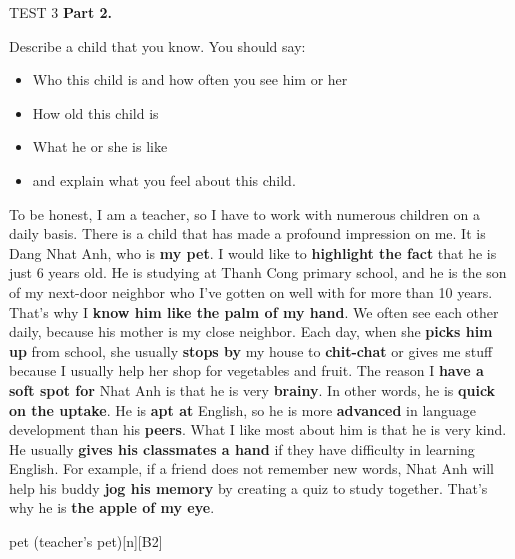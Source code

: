 \begin{glossarymc}[Cambridge 10]
\begin{test}{TEST 3}
    \noindent
    \textbf{Part 2.}
    \begin{qa}{Describe a child that you know. You should say:}
    \begin{itemize}
    \item Who this child is and how often you see him or her
    \item How old this child is
    \item What he or she is like
    \item and explain what you feel about this child.
    \end{itemize}

    To be honest, I am a teacher, so I have to work with numerous children on a daily basis. There is a child that has made a profound impression on me. It is Dang Nhat Anh, who is \textbf{my pet}. I would like to \textbf{highlight the fact} that he is just 6 years old. He is studying at Thanh Cong primary school, and he is the son of my next-door neighbor who I've gotten on well with for more than 10 years. That's why I \textbf{know him like the palm of my hand}. We often see each other daily, because his mother is my close neighbor. Each day, when she \textbf{picks him up} from school, she usually \textbf{stops by} my house to \textbf{chit-chat} or gives me stuff because I usually help her shop for vegetables and fruit. The reason I \textbf{have a soft spot for} Nhat Anh is that he is very \textbf{brainy}. In other words, he is \textbf{quick on the uptake}. He is \textbf{apt at} English, so he is more \textbf{advanced} in language development than his \textbf{peers}. What I like most about him is that he is very kind. He usually \textbf{gives his classmates a hand} if they have difficulty in learning English. For example, if a friend does not remember new words, Nhat Anh will help his buddy \textbf{jog his memory} by creating a quiz to study together. That's why he is \textbf{the apple of my eye}.
    \end{qa}

        \begin{VocabExplain}[Part 2]
            \begin{ExplainCard}{pet (teacher's pet)}[n][B2]
            \end{ExplainCard}


\end{VocabExplain}
\end{test}
\end{glossarymc}
